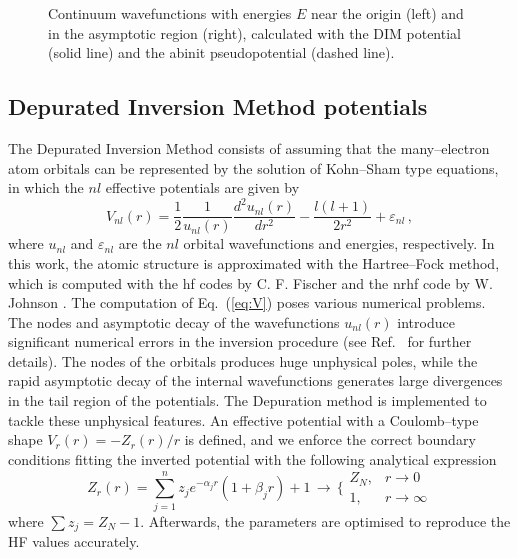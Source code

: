 \documentclass[10pt]{article}
\begin{document}
\begin{figure}[H]
 \caption{Continuum wavefunctions with energies $E$ near the origin 
 (left) and in the asymptotic region (right), calculated with the 
 DIM potential (solid line) and the {\sc abinit} pseudopotential (dashed line). }
 \label{fig:contLi}
\end{figure}

\subsection{Depurated Inversion Method potentials}
\label{sec:DIM}

The Depurated Inversion Method \cite{Mendez2015,Mendez2016,Mendez2018} 
consists of assuming that the many--electron atom orbitals can be 
represented by the solution of Kohn--Sham type equations, in which 
the $nl$ effective potentials are given by 
\begin{equation}
V_{nl}(r) = 
\frac{1}{2}\frac{1}{u_{nl}(r)}
\frac{d^2u_{nl}(r)}{dr^{2}} - 
\frac{l(l+1)}{2r^{2}}+\varepsilon_{nl} \, ,
\label{eq:V}
\end{equation}
where $u_{nl}$ and $\varepsilon_{nl}$ are the $nl$ orbital wavefunctions and
energies, respectively. In this work, the atomic structure is
approximated with the Hartree--Fock method, 
which is computed with the {\sc hf} codes by 
C. F. Fischer \cite{FroeseFischer1997} and the {\sc nrhf} code by 
W. Johnson \cite{Johnson2007}. The computation of Eq.~(\ref{eq:V}) 
poses various numerical problems. The nodes and asymptotic decay
of the wavefunctions $u_{nl}(r)$ introduce significant numerical errors in
the inversion procedure (see Ref.~\cite{Mendez2018} for further 
details). The nodes of the orbitals produces huge unphysical 
poles, while the rapid asymptotic decay of the internal wavefunctions 
generates large divergences in the tail region of the potentials.
The Depuration method is implemented to tackle these unphysical features. 
An effective potential with a Coulomb--type shape $V_r(r)=-Z_r(r)/r$ 
is defined, and we enforce the correct boundary 
conditions fitting the inverted potential with the following analytical 
expression
\begin{equation}
 Z_r(r) = \sum_{j=1}^n z_j e^{-\alpha_j r}(1+\beta_jr) + 1
 \, \longrightarrow \, \bigg\{
 \begin{array}{cc}
  Z_N, & r\rightarrow0 \\
  1, & r\rightarrow\infty 
 \end{array}
 \label{eq:atomiczDIM}
\end{equation} 
where \mbox{$\sum z_j = Z_N-1$}. Afterwards, the parameters are 
optimised to reproduce the HF values accurately. 
\end{document}
